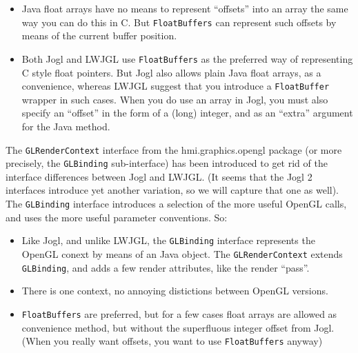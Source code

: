 \begin{itemize}
\begin{itemize}
     \item Java float arrays have no means to represent ``offsets'' into an array the same way you can do this in C. But \verb"FloatBuffers" can represent such offsets by means of the current buffer position.
     \item Both Jogl and LWJGL use \verb"FloatBuffers" as the preferred way of representing C style float pointers. But Jogl also allows plain Java float arrays, as a convenience, whereas LWJGL suggest that you introduce a \verb"FloatBuffer" wrapper in such cases. When you do use an array in Jogl, you must also specify
         an ``offset'' in the form of a (long) integer, and as an ``extra'' argument for the Java method. 
    \end{itemize}
    
    
\end{itemize}
The \verb"GLRenderContext" interface from the hmi.graphics.opengl package (or more precisely, the \verb"GLBinding" sub-interface) has been introduced to get rid of the interface differences between Jogl and LWJGL. (It seems that the Jogl 2 interfaces introduce yet another variation, so we will capture that one as well).
The \verb"GLBinding" interface introduces a selection of the more useful OpenGL calls, and uses the more useful
 parameter conventions. So:
 \begin{itemize}
 \item Like Jogl, and unlike LWJGL, the \verb"GLBinding" interface represents the OpenGL conext by means of an Java object. The \verb"GLRenderContext" extends \verb"GLBinding", and adds a few render attributes, like the render ``pass''.
 \item There is one context, no annoying distictions between OpenGL versions.
 \item \verb"FloatBuffers" are preferred, but for a few cases float arrays are allowed as convenience method, but without the superfluous integer offset from Jogl. (When you really  want offsets, you want to use \verb"FloatBuffers" anyway)
 \end{itemize}
 
